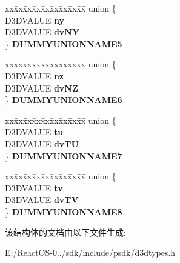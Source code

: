 \begin{DoxyCompactItemize}
\begin{tabbing}
\end{tabbing}\item 
\mbox{\label{struct___d3_d_v_e_r_t_e_x_a64849cae4fbb42e0b03997c67d569358}} 
\begin{tabbing}
xx\=xx\=xx\=xx\=xx\=xx\=xx\=xx\=xx\=\kill
union \{\\
\>D3DVALUE {\bfseries ny}\\
\>D3DVALUE {\bfseries dvNY}\\
\} {\bfseries DUMMYUNIONNAME5}\\

\end{tabbing}\item 
\mbox{\label{struct___d3_d_v_e_r_t_e_x_a5e61bb345950fb667edb97e5f9b933be}} 
\begin{tabbing}
xx\=xx\=xx\=xx\=xx\=xx\=xx\=xx\=xx\=\kill
union \{\\
\>D3DVALUE {\bfseries nz}\\
\>D3DVALUE {\bfseries dvNZ}\\
\} {\bfseries DUMMYUNIONNAME6}\\

\end{tabbing}\item 
\mbox{\label{struct___d3_d_v_e_r_t_e_x_a12c5c9c7f4f2d9467938ccc484356ad7}} 
\begin{tabbing}
xx\=xx\=xx\=xx\=xx\=xx\=xx\=xx\=xx\=\kill
union \{\\
\>D3DVALUE {\bfseries tu}\\
\>D3DVALUE {\bfseries dvTU}\\
\} {\bfseries DUMMYUNIONNAME7}\\

\end{tabbing}\item 
\mbox{\label{struct___d3_d_v_e_r_t_e_x_af86390b125bb5dd37ff1658f5755a301}} 
\begin{tabbing}
xx\=xx\=xx\=xx\=xx\=xx\=xx\=xx\=xx\=\kill
union \{\\
\>D3DVALUE {\bfseries tv}\\
\>D3DVALUE {\bfseries dvTV}\\
\} {\bfseries DUMMYUNIONNAME8}\\

\end{tabbing}\end{DoxyCompactItemize}


该结构体的文档由以下文件生成\+:\begin{DoxyCompactItemize}
\item 
E\+:/\+React\+O\+S-\/0../sdk/include/psdk/d3dtypes.\+h\end{DoxyCompactItemize}
